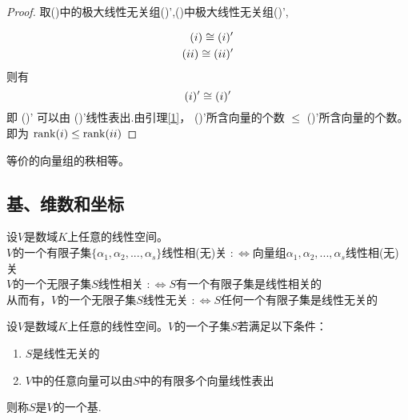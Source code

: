 \documentclass[blue,normal,cn]{elegantnote}
\begin{document}
\begin{proof}
    取(\uppercase\expandafter{})中的极大线性无关组(\uppercase\expandafter{})',(\uppercase\expandafter{})中极大线性无关组(\uppercase\expandafter{})',

    \begin{equation*}
        \begin{aligned}
            (\uppercase\expandafter{\romannumeral1})\cong (\uppercase\expandafter{\romannumeral1})'\\
            (\uppercase\expandafter{\romannumeral2}) \cong (\uppercase\expandafter{\romannumeral2})'
        \end{aligned}
    \end{equation*}
    则有
    \begin{equation*}
        (\uppercase\expandafter{\romannumeral1})'\cong (\uppercase\expandafter{\romannumeral1})'\\
    \end{equation*}
    即 (\uppercase\expandafter{})' 可以由  (\uppercase\expandafter{})'线性表出.由引理\ref{1}，  (\uppercase\expandafter{})'所含向量的个数 $\leq$ (\uppercase\expandafter{})'所含向量的个数。即为
    $\mathrm{rank}(\uppercase\expandafter{\romannumeral1}) \leq \mathrm{rank}(\uppercase\expandafter{\romannumeral2})$
\end{proof}

\begin{corollary}
    \label{4}
等价的向量组的秩相等。
\end{corollary}




\subsection{基、维数和坐标}

\begin{definition}
    设$V$是数域$K$上任意的线性空间。\\
    $V$的一个有限子集$\{α_1,α_2,...,α_s\}$线性相(无)关
    $:\Leftrightarrow$向量组$α_1,α_2,...,α_s$线性相(无)关\\
    $V$的一个无限子集$S$线性相关
    $:\Leftrightarrow S$有一个有限子集是线性相关的\\
    从而有，$V$的一个无限子集$S$线性无关 $:\Leftrightarrow S$任何一个有限子集是线性无关的
\end{definition}

\begin{definition}
    设$V$是数域$K$上任意的线性空间。$V$的一个子集$S$若满足以下条件：
    \begin{enumerate}
        \item $S$是线性无关的
        \item $V$中的任意向量可以由$S$中的有限多个向量线性表出
    \end{enumerate}
    则称$S$是$V$的一个基.
\end{definition}
\end{document}
